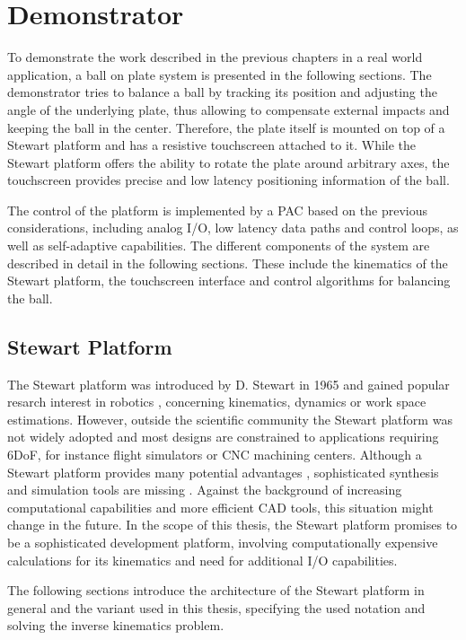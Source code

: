 \chapter{Demonstrator}
\label{sec:demo}

To demonstrate the work described in the previous chapters in a real world
application, a ball on plate system is presented in the following sections.
The demonstrator tries to balance a ball by tracking its position and
adjusting the angle of the underlying plate, thus allowing to compensate
external impacts and keeping the ball in the center. Therefore, the plate
itself is mounted on top of a Stewart platform and has a resistive touchscreen
attached to it. While the Stewart platform offers the ability to rotate the
plate around arbitrary axes, the touchscreen provides precise and low latency
positioning information of the ball.

The control of the platform is implemented by a \ac{PAC} based on the previous
considerations, including analog I/O, low latency data paths and control
loops, as well as self-adaptive capabilities. The different components of the
system are described in detail in the following sections. These include the
kinematics of the Stewart platform, the touchscreen interface and control
algorithms for balancing the ball.

\section{Stewart Platform}
The Stewart platform was introduced by D. Stewart in 1965 \citep{Ste65} and
gained popular resarch interest in robotics \citep{Szu13}, concerning
kinematics, dynamics or work space estimations. However, outside the
scientific community the Stewart platform was not widely adopted and most
designs are constrained to applications requiring \ac{6DoF}, for instance
flight simulators or \ac{CNC} machining centers. Although a Stewart platform
provides many potential advantages , sophisticated synthesis and simulation
tools are missing \citep{Ji96}. Against the background of increasing
computational capabilities and more efficient \ac{CAD} tools, this situation
might change in the future. In the scope of this thesis, the Stewart platform
promises to be a sophisticated development platform, involving computationally
expensive calculations for its kinematics and need for additional I/O
capabilities.

The following sections introduce the architecture of the Stewart platform in
general and the variant used in this thesis, specifying the used notation and
solving the inverse kinematics problem.

